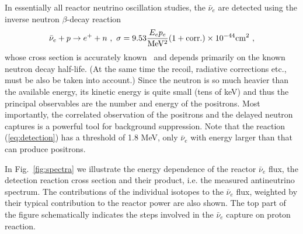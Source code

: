 \documentclass[aps,twocolumn,preprintnumbers,amsmath,superscriptaddress,amssymb,floats,nofootinbib]{revtex4-1}
\begin{document}
In essentially all reactor neutrino oscillation studies, the $\bar{\nu}_e$ are detected using the inverse neutron $\beta$-decay reaction
\begin{equation}
\bar{\nu}_e + p \rightarrow e^+ + n~, \\ ~ \sigma = 9.53 \frac{E_e p_e}{ {\rm MeV^2}} (1 + \textrm{corr.}) \times 10^{-44} {\rm cm^2} ~,
\label{eq:detection}
\end{equation}
whose cross section is accurately known~\cite{VB99, Strumia} and depends primarily on the known neutron decay half-life. (At the same time the recoil, radiative
corrections etc., must be also be taken into account.) Since the neutron is so much heavier than the available energy, its kinetic energy is quite
small (tens of keV) and thus the principal observables are the number and energy of the positrons. Most importantly, the correlated observation of the
positrons and the delayed neutron captures is a powerful tool for background suppression. Note that the reaction (\ref{eq:detection}) has
a threshold of 1.8 MeV, only $\bar{\nu}_e$ with energy larger than that can produce positrons.

In Fig.~\ref{fig:spectra} we illustrate the energy dependence of the reactor $\bar{\nu}_e$ flux, the detection reaction cross section and their product,
i.e. the measured antineutrino spectrum. The contributions of the individual isotopes to the $\bar{\nu}_e$ flux, weighted by their typical contribution
to the reactor power are also shown. The top part of the figure schematically indicates the steps involved in the $\bar{\nu}_e$ capture on proton reaction.


\onecolumngrid
\vspace{12pt}
\fboxsep=12pt
\end{document}
